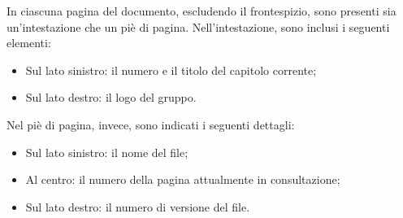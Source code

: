 In ciascuna pagina del documento, escludendo il frontespizio, sono presenti sia un’intestazione
che un piè di pagina. Nell’intestazione, sono inclusi i seguenti elementi:
\begin{itemize}
    \item Sul lato sinistro: il numero e il titolo del capitolo corrente;
    \item Sul lato destro: il logo del gruppo.
\end{itemize}
Nel piè di pagina, invece, sono indicati i seguenti dettagli:
\begin{itemize}
    \item Sul lato sinistro: il nome del file;
    \item Al centro: il numero della pagina attualmente in consultazione;
    \item Sul lato destro: il numero di versione del file.
\end{itemize}

